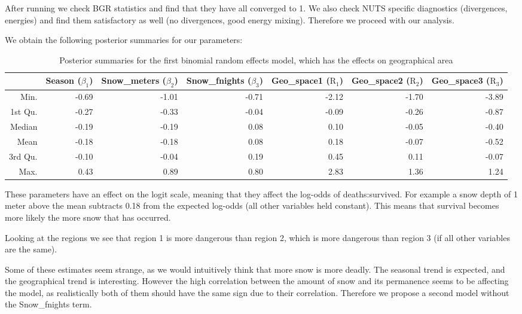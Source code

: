 \documentclass[10pt]{extarticle}
\begin{document}
After running we check BGR statistics and find that they have all converged to 1. We also check NUTS specific diagnostics (divergences, energies) and find them satisfactory as well (no divergences, good energy mixing). Therefore we proceed with our analysis.

We obtain the following posterior summaries for our parameters:

\begin{table}[ht]
	\centering
	\footnotesize
	\begin{tabular}{r|rrrrrr}
		\hline
		& Season ($\beta_1$) & Snow\_meters ($\beta_2$) & Snow\_fnights ($\beta_3$) & Geo\_space1 ($\mathrm{R}_{1}$) & Geo\_space2 ($\mathrm{R}_{2}$) & Geo\_space3 ($\mathrm{R}_{3}$)\\ 
		\hline
		Min. & -0.69 & -1.01 & -0.71 & -2.12 & -1.70 & -3.89 \\ 
		1st Qu. & -0.27 & -0.33 & -0.04 & -0.09 & -0.26 & -0.87 \\ 
		Median & -0.19 & -0.19 & 0.08 & 0.10 & -0.05 & -0.40 \\ 
		Mean & -0.18 & -0.18 & 0.08 & 0.18 & -0.07 & -0.52 \\ 
		3rd Qu. & -0.10 & -0.04 & 0.19 & 0.45 & 0.11 & -0.07 \\ 
		Max. & 0.43 & 0.89 & 0.80 & 2.83 & 1.36 & 1.24 \\ 
		\hline
	\end{tabular}
\caption{Posterior summaries for the first binomial random effects model, which has the effects on geographical area}
\label{tab:postsum_binmod1}
\end{table}

These parameters have an effect on the logit scale, meaning that they affect the log-odds of deaths:survived. For example a snow depth of 1 meter above the mean subtracts 0.18 from the expected log-odds (all other variables held constant). This means that survival becomes more likely the more snow that has occurred. 

Looking at the regions we see that region 1 is more dangerous than region 2, which is more dangerous than region 3 (if all other variables are the same). 

Some of these estimates seem strange, as we would intuitively think that more snow is more deadly. The seasonal trend is expected, and the geographical trend is interesting. However the high correlation between the amount of snow and its permanence seems to be affecting the model, as realistically both of them should have the same sign due to their correlation. Therefore we propose a second model without the Snow\_fnights term.
\end{document}
